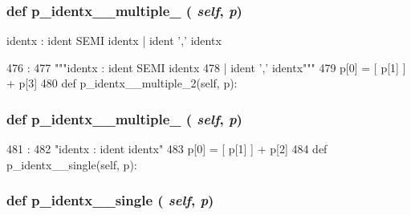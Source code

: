 \begin{DoxyVerb}
{\subsubsection[{p\_\-identx\_\-\_\-multiple\_\-1}]{\setlength{\rightskip}{0pt plus 5cm}def p\_\-identx\_\-\_\-multiple\_ ( {\em self}, \/   {\em p})}}
\label{classslicc_1_1parser_1_1SLICC_a6344d2871d9bb2fde5d940b92dbb8fd6}
\begin{DoxyVerb}identx : ident SEMI identx
  | ident ',' identx\end{DoxyVerb}
 


\begin{DoxyCode}
476                                      :
477         """identx : ident SEMI identx
478                   | ident ',' identx"""
479         p[0] = [ p[1] ] + p[3]
480 
    def p_identx__multiple_2(self, p):
\end{DoxyCode}
\hypertarget{classslicc_1_1parser_1_1SLICC_af5bf282b073c0295d74b7244ae21d607}{
\subsubsection[{p\_\-identx\_\-\_\-multiple\_\-2}]{\setlength{\rightskip}{0pt plus 5cm}def p\_\-identx\_\-\_\-multiple\_ ( {\em self}, \/   {\em p})}}
\label{classslicc_1_1parser_1_1SLICC_af5bf282b073c0295d74b7244ae21d607}



\begin{DoxyCode}
481                                      :
482         "identx : ident identx"
483         p[0] = [ p[1] ] + p[2]
484 
    def p_identx__single(self, p):
\end{DoxyCode}
\hypertarget{classslicc_1_1parser_1_1SLICC_a6ab9c67e60b1329015b55e7b13a58bf2}{
\subsubsection[{p\_\-identx\_\-\_\-single}]{\setlength{\rightskip}{0pt plus 5cm}def p\_\-identx\_\-\_\-single ( {\em self}, \/   {\em p})}}
\label{classslicc_1_1parser_1_1SLICC_a6ab9c67e60b1329015b55e7b13a58bf2}




\end{DoxyVerb}
